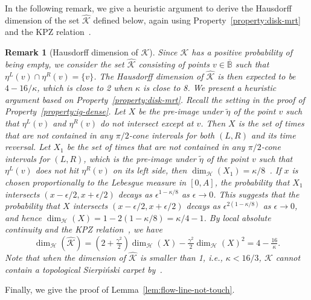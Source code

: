 \documentclass[a4paper]{article}
\numberwithin{equation}{section}
\newtheorem{remark}[theorem]{Remark}
\numberwithin{equation}{section}
\renewcommand{\1}{\mathbf{1}}
\begin{document}
In the following remark, we give a heuristic argument to derive the Hausdorff dimension of the set $\widehat{\mathcal{K}}$ defined below, again using Property~\eqref{property:disk-mrt} and the KPZ relation~\cite{GHM20-SLE-KPZ}.

\begin{remark}[Hausdorff dimension of $\mathcal{K}$]\label{rem:dimension-k}
    Since $\mathcal{K}$ has a positive probability of being empty, we consider the set $\widehat{\mathcal{K}}$ consisting of points $v \in \overline{\mathbb B}$ such that $\eta^L(v) \cap \eta^R(v)=\{v\}$. The Hausdorff dimension of $\widehat{\mathcal{K}}$ is then expected to be $4-16/\kappa$, which is close to 2 when $\kappa$ is close to 8. We present a heuristic argument based on Property~\eqref{property:disk-mrt}. Recall the setting in the proof of Property~\eqref{property:ig-dense}. Let $X$ be the pre-image under $\widetilde \eta$ of the point $v$ such that $\eta^L(v)$ and $\eta^R(v)$ do not intersect except at $v$. Then $X$ is the set of times that are not contained in any $\pi/2$-cone intervals for both $(L,R)$ and its time reversal.
    Let $X_1$ be the set of times that are not contained in any $\pi/2$-cone intervals for $(L,R)$, which is the pre-image under $\widetilde \eta$ of the point $v$ such that $\eta^L(v)$ does not hit $\eta^R(v)$ on its left side, then $\dim_{\mathcal H}(X_1)=\kappa/8$~\cite[Example 2.3]{GHM20-SLE-KPZ}. If $x$ is chosen proportionally to the Lebesgue measure in $[0,A]$, the probability that $X_1$ intersects $(x-\epsilon/2,x+\epsilon/2)$ decays as $\epsilon^{1-\kappa/8}$ as $\epsilon \to 0$.
    This suggests that the probability that $X$ intersects $(x-\epsilon/2,x+\epsilon/2)$ decays as $\epsilon^{2(1-\kappa/8)}$ as $\epsilon \to 0$, and hence $\dim_{\mathcal H}(X)=1-2(1-\kappa/8)=\kappa/4-1$. By local absolute continuity and the KPZ relation~\cite{GHM20-SLE-KPZ}, we have
    \[ \dim_{\mathcal H}(\widehat{\mathcal{K}})=(2+\tfrac{\gamma^2}{2})\dim_{\mathcal H}(X)-\tfrac{\gamma^2}{2}\dim_{\mathcal H}(X)^2=4-\tfrac{16}{\kappa}. \]
    Note that when the dimension of $\widehat{\mathcal{K}}$ is smaller than 1, i.e., $\kappa < 16/3$, $\mathcal{K}$ cannot contain a topological Sierpi\'nski carpet by~\cite[Proposition 3.5]{falconer-fractal-geometry}.
\end{remark}

Finally, we give the proof of Lemma~\ref{lem:flow-line-not-touch}.
\end{document}
